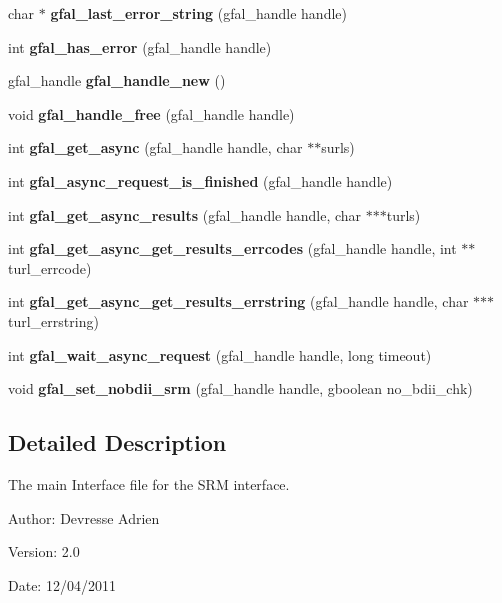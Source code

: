 \begin{CompactItemize}
\item 
char $\ast$ \textbf{gfal\_\-last\_\-error\_\-string} (gfal\_\-handle handle)\label{gfal__common__interface_8h_bdebd69c0c6a74b1b5adf88b5e836d8a}

\item 
int \textbf{gfal\_\-has\_\-error} (gfal\_\-handle handle)\label{gfal__common__interface_8h_ad28f1c5d1a0ed623834e6133bb7dd2e}

\item 
gfal\_\-handle \textbf{gfal\_\-handle\_\-new} ()\label{gfal__common__interface_8h_4211faf02a3c5cc696c7c9f974415d11}

\item 
void \textbf{gfal\_\-handle\_\-free} (gfal\_\-handle handle)\label{gfal__common__interface_8h_0071cb3665f7dca9648fa46bebeca524}

\item 
int \textbf{gfal\_\-get\_\-async} (gfal\_\-handle handle, char $\ast$$\ast$surls)\label{gfal__common__interface_8h_68ef05f37b4971c8306b1cc6ee529647}

\item 
int \textbf{gfal\_\-async\_\-request\_\-is\_\-finished} (gfal\_\-handle handle)\label{gfal__common__interface_8h_ce6fcac8e92ad2e1d699eed2ce74a257}

\item 
int \textbf{gfal\_\-get\_\-async\_\-results} (gfal\_\-handle handle, char $\ast$$\ast$$\ast$turls)\label{gfal__common__interface_8h_0c654545b837b8e1928842ee762ce5e9}

\item 
int \textbf{gfal\_\-get\_\-async\_\-get\_\-results\_\-errcodes} (gfal\_\-handle handle, int $\ast$$\ast$turl\_\-errcode)\label{gfal__common__interface_8h_a3161f12f9d5c8151f44df4f132602cb}

\item 
int \textbf{gfal\_\-get\_\-async\_\-get\_\-results\_\-errstring} (gfal\_\-handle handle, char $\ast$$\ast$$\ast$turl\_\-errstring)\label{gfal__common__interface_8h_ecd7d68b18088ff620d21dbef85862ae}

\item 
int \textbf{gfal\_\-wait\_\-async\_\-request} (gfal\_\-handle handle, long timeout)\label{gfal__common__interface_8h_08c8573e050334d5342a31a48b7db4cb}

\item 
void \textbf{gfal\_\-set\_\-nobdii\_\-srm} (gfal\_\-handle handle, gboolean no\_\-bdii\_\-chk)\label{gfal__common__interface_8h_5e3afd0690b23dedf14d6fa7898f28a9}

\end{CompactItemize}


\subsection{Detailed Description}
The main Interface file for the SRM interface. 

\begin{Desc}
\item[Author:]Devresse Adrien \end{Desc}
\begin{Desc}
\item[Version:]2.0 \end{Desc}
\begin{Desc}
\item[Date:]12/04/2011 \end{Desc}
